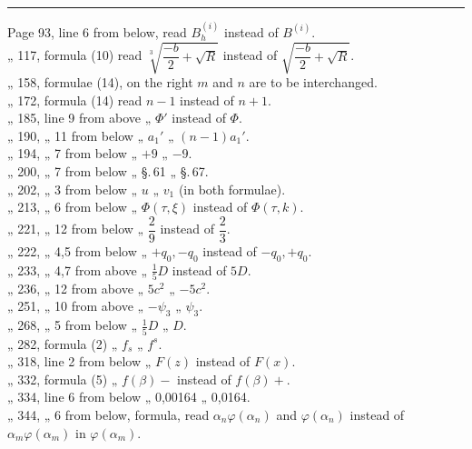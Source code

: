 \begin{center}
\textbf{}
\end{center}

\begin{center}
\rule{4cm}{0.4pt}
\end{center}

\begin{flushleft}
Page 93, line 6 from below, read $B_h^{(i)}$ instead of $B^{(i)}$. \\
„ 117, formula (10) read $\sqrt[3]{\dfrac{-b}{2}+\sqrt{R}}$ instead of $\sqrt{\dfrac{-b}{2}+\sqrt{R}}$. \\
„ 158, formulae (14), on the right $m$ and $n$ are to be interchanged. \\
„ 172, formula (14) read $n-1$ instead of $n+1$. \\
„ 185, line 9 from above „ $\Phi'$ instead of $\Phi$. \\
„ 190, „ 11 from below „ $a_1'$ „ $(n-1)a_1'$. \\
„ 194, „ 7 from below „ $+9$ „ $-9$. \\
„ 200, „ 7 from below „ \S.\,61 „ \S.\,67. \\
„ 202, „ 3 from below „ $u$ „ $v_1$ (in both formulae). \\
„ 213, „ 6 from below „ $\Phi(\tau,\xi)$ instead of $\Phi(\tau,k)$. \\
„ 221, „ 12 from below „ $\dfrac{2}{9}$ instead of $\dfrac{2}{3}$. \\
„ 222, „ 4,5 from below „ $+q_0, -q_0$ instead of $-q_0, +q_0$. \\
„ 233, „ 4,7 from above „ $\tfrac{1}{5}D$ instead of $5D$. \\
„ 236, „ 12 from above „ $5c^2$ „ $-5c^2$. \\
„ 251, „ 10 from above „ $-\psi_3$ „ $\psi_3$. \\
„ 268, „ 5 from below „ $\tfrac{1}{5}D$ „ $D$. \\
„ 282, formula (2) „ $f_s$ „ $f^s$. \\
„ 318, line 2 from below „ $F(z)$ instead of $F(x)$. \\
„ 332, formula (5) „ $f(\beta)-$ instead of $f(\beta)+$. \\
„ 334, line 6 from below „ 0,00164 „ 0,0164. \\
„ 344, „ 6 from below, formula, read $\alpha_n\varphi(\alpha_n)$ and $\varphi(\alpha_n)$ instead of $\alpha_m\varphi(\alpha_m)$
in $\varphi(\alpha_m)$. \\

\end{flushleft}

